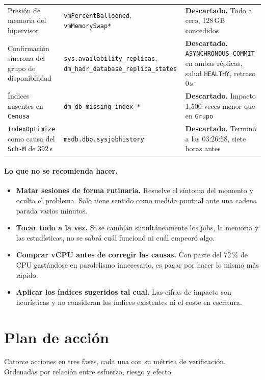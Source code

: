\documentclass[11pt,a4paper]{article}
\newcommand{\cod}[1]{\texttt{\small #1}}
\newcommand{\bien}[1]{\textcolor{verde}{\textbf{#1}}}
\begin{document}
\begin{longtable}{p{4.1cm}p{5.1cm}p{5.4cm}}
Presión de memoria del hipervisor
  & \cod{vmPercentBallooned}, \cod{vmMemorySwap*}
  & \bien{Descartado.} Todo a cero, 128\,GB concedidos \\
Confirmación síncrona del grupo de disponibilidad
  & \cod{sys.availability\_replicas}, \cod{dm\_hadr\_database\_replica\_states}
  & \bien{Descartado.} \cod{ASYNCHRONOUS\_COMMIT} en ambas réplicas, salud
    \cod{HEALTHY}, retraso 0\,s \\
Índices ausentes en \cod{Cenusa}
  & \cod{dm\_db\_missing\_index\_*}
  & \bien{Descartado.} Impacto 1.500 veces menor que en \cod{Grupo} \\
\cod{IndexOptimize} como causa del \cod{Sch-M} de 392\,s
  & \cod{msdb.dbo.sysjobhistory}
  & \bien{Descartado.} Terminó a las 03:26:58, siete horas antes \\
\bottomrule
\end{longtable}

\paragraph{Lo que no se recomienda hacer.}

\begin{itemize}[leftmargin=1.4em]\itemsep3pt
  \item \textbf{Matar sesiones de forma rutinaria.} Resuelve el síntoma del
        momento y oculta el problema. Solo tiene sentido como medida puntual
        ante una cadena parada varios minutos.
  \item \textbf{Tocar todo a la vez.} Si se cambian simultáneamente los jobs,
        la memoria y las estadísticas, no se sabrá cuál funcionó ni cuál
        empeoró algo.
  \item \textbf{Comprar vCPU antes de corregir las causas.} Con parte del
        72\,\% de CPU gastándose en paralelismo innecesario, es pagar por
        hacer lo mismo más rápido.
  \item \textbf{Aplicar los índices sugeridos tal cual.} Las cifras de
        impacto son heurísticas y no consideran los índices existentes ni el
        coste en escritura.
\end{itemize}

\newpage
\section{Plan de acción}
\label{sec:plan}

Catorce acciones en tres fases, cada una con su métrica de verificación.
Ordenadas por relación entre esfuerzo, riesgo y efecto.
\end{document}
